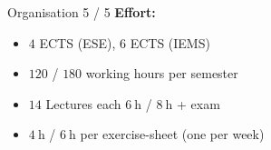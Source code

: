 
\begin{frame}{Organisation 5 / 5}
  \textbf{Effort:}
  \begin{itemize}
    \item
      {\color{MainA}$\num{4}$ ECTS} (ESE),
      {\color{MainA}$\num{6}$ ECTS} (IEMS)
    \item
      {\color{MainA}$\num{120}$} /
      {\color{MainA}$\num{180}$}
      working hours per semester
    \item
      {\color{MainA}$\num{14}$} Lectures each
      {\color{MainA}$\SI{6}{\hour}$} /
      {\color{MainA}$\SI{8}{\hour}$} + exam
    \item
      {\color{MainA}$\SI{4}{\hour}$} /
      {\color{MainA}$\SI{6}{\hour}$} per exercise-sheet (one per week)
  \end{itemize}
\end{frame}

